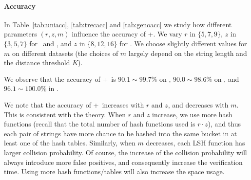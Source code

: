 \begin{table*}[!ht]
\centering
{}
  \caption{Accuracy of \ebdjoin+, \genoa\ dataset, $K=100, m = 13$}
\label{tab:genoaccdel}
\end{table*}


\paragraph{Accuracy}
In Table~\ref{tab:uniacc}, \ref{tab:trecacc} and \ref{tab:genoacc} we study how different parameters $(r, z, m)$ influence the accuracy of \ebdjoin+. 
We vary $r$ in $\{5,7,9\}$, $z$ in $\{3,5,7\}$ for \trec\ and \uniref, and $z$ in $\{8,12,16\}$ for \genoa. We choose slightly different values for $m$ on different datasets (the choices of $m$ largely depend on the string length and the distance threshold $K$).  

We observe that the accuracy of \ebdjoin+\ is $90.1 \sim 99.7\%$ on \uniref, $90.0 \sim 98.6\%$ on \trec, 
and $96.1 \sim 100.0\%$ in \genoa.  

We note that the accuracy of \ebdjoin+\ increases with $r$ and $z$, and decreases with $m$. This is consistent with the theory.  When $r$ and $z$ increase, we use more hash functions (recall that the total number of hash functions used is $r \cdot z$), and thus each pair of strings have more chance to be hashed into the same bucket in at least one of the hash tables. Similarly, when $m$ decreases, each LSH function has larger collision probability.  Of course, the increase of the collision probability will always introduce more false positives, and consequently increase the verification time.  Using more hash functions/tables will also increase the space usage.  




